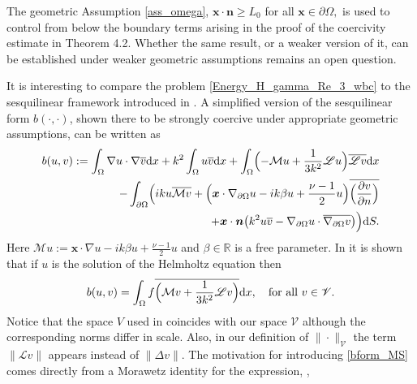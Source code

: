 \documentclass[twoside,11pt]{article}
\def\dimx{\nu }
\def\d{{\mathrm d}}
\def\L{{\mathscr{L}}}
\renewcommand{\vec}[1]{\boldsymbol{#1}}
\def\Vc{{\mathscr V}}
\def\L{{\mathscr{L}}}
\begin{document}
{\begin{remark}\label {Rem3.6}
The geometric Assumption \ref{ass_omega},
$
\vec{x}\cdot\vec{n}\ge L_0$ for all $ \vec{x}\in\partial\Omega,
$
is used to control from below the boundary terms arising in the proof of the coercivity estimate in Theorem 4.2. Whether the same result, or a weaker version of it, can be established under weaker geometric assumptions remains an open question.
 \end{remark}


\begin{remark}\label{remark_MS}
It is interesting to compare the problem \eqref{Energy_H_gamma_Re_3_wbc} to the sesquilinear framework introduced in \cite{Moiola_Spence2014}. {A simplified version of the sesquilinear form $b(\cdot,\cdot)$, shown there to be strongly coercive under appropriate geometric assumptions, can be written as}
\begin{equation}\label{bform_MS}
\begin{split}
b(u,v)  :=  \int_\Omega \nabla u\cdot \nabla \overline{v}  \d x  +  k^2 \int_\Omega  u \overline{v} \d x
 +  \int_{\Omega} \Bigl(-\mathcal{M}u + \frac{1}{3k^2} \L u \Bigr)  \overline{\L v}  \d x \\
-  \int_{\partial\Omega} \Bigl(
ik u \overline{\mathcal{M}v}
 + 
\Bigl( \vec{x}\cdot \nabla_{\partial\Omega} u - i k \beta  u + \frac{\dimx-1}{2} u \Bigr) 
\overline{\Bigl( \frac{\partial v}{\partial n} \Bigr)}\\
 + 
\vec{x}\cdot\vec{n} \bigl(
k^2 u \overline{v} - \nabla_{\partial\Omega} u \cdot \overline{\nabla_{\partial\Omega} v}
\bigr)
\Bigr)  \d S.
\end{split}
\end{equation}
Here $\mathcal{M}u := \vec{x}\cdot \nabla u - i k \beta  u + \frac{\dimx-1}{2} u$ and $\beta\in\mathbb{R}$ {is a free parameter}. {In} \cite{Moiola_Spence2014} it is shown that if $u$ is the solution of the {Helmholtz} equation then
\[
b(u, v)  =  \int_{\Omega } f   \overline{\Bigl(\mathcal{M}v + \frac{1}{3k^2}  \L v\Bigr)}   \d x,
\quad \text{for all } v \in \Vc.
\]
Notice that the space $V$ used in \cite{Moiola_Spence2014} coincides with our space $\Vc$ although the corresponding norms differ in scale. Also, in our definition of $\| \cdot\|_{\Vc}$ the term $\| \L v\| $ appears instead of  $\| \Delta v\| .$  The motivation for introducing \eqref{bform_MS} comes directly from a Morawetz
identity for the expression, \cite[Section 1.4]{Moiola_Spence2014},
\begin{align}\label{morawetz_MS}

\end{align}
\end{remark}}
\end{document}
